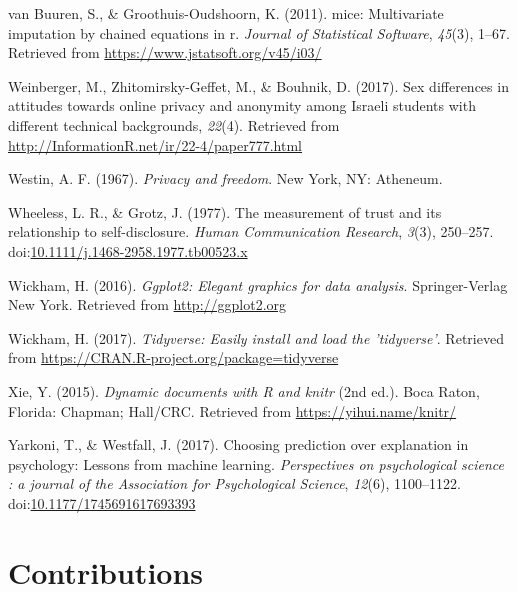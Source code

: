 \documentclass[man,floatsintext]{apa6}
\begin{document}
\leavevmode\hypertarget{ref-R-mice}{}%
van Buuren, S., \& Groothuis-Oudshoorn, K. (2011). mice: Multivariate imputation by chained equations in r. \emph{Journal of Statistical Software}, \emph{45}(3), 1--67. Retrieved from \url{https://www.jstatsoft.org/v45/i03/}

\leavevmode\hypertarget{ref-Weinberger.2017b}{}%
Weinberger, M., Zhitomirsky-Geffet, M., \& Bouhnik, D. (2017). Sex differences in attitudes towards online privacy and anonymity among Israeli students with different technical backgrounds, \emph{22}(4). Retrieved from \url{http://InformationR.net/ir/22-4/paper777.html}

\leavevmode\hypertarget{ref-Westin.1967}{}%
Westin, A. F. (1967). \emph{Privacy and freedom}. New York, NY: Atheneum.

\leavevmode\hypertarget{ref-Wheeless.1977}{}%
Wheeless, L. R., \& Grotz, J. (1977). The measurement of trust and its relationship to self-disclosure. \emph{Human Communication Research}, \emph{3}(3), 250--257. doi:\href{https://doi.org/10.1111/j.1468-2958.1977.tb00523.x}{10.1111/j.1468-2958.1977.tb00523.x}

\leavevmode\hypertarget{ref-R-ggplot2}{}%
Wickham, H. (2016). \emph{Ggplot2: Elegant graphics for data analysis}. Springer-Verlag New York. Retrieved from \url{http://ggplot2.org}

\leavevmode\hypertarget{ref-R-tidyverse}{}%
Wickham, H. (2017). \emph{Tidyverse: Easily install and load the 'tidyverse'}. Retrieved from \url{https://CRAN.R-project.org/package=tidyverse}

\leavevmode\hypertarget{ref-R-knitr}{}%
Xie, Y. (2015). \emph{Dynamic documents with R and knitr} (2nd ed.). Boca Raton, Florida: Chapman; Hall/CRC. Retrieved from \url{https://yihui.name/knitr/}

\leavevmode\hypertarget{ref-Yarkoni.2017}{}%
Yarkoni, T., \& Westfall, J. (2017). Choosing prediction over explanation in psychology: Lessons from machine learning. \emph{Perspectives on psychological science : a journal of the Association for Psychological Science}, \emph{12}(6), 1100--1122. doi:\href{https://doi.org/10.1177/1745691617693393}{10.1177/1745691617693393}

\endgroup

\newpage

\hypertarget{contributions}{%
\section{Contributions}\label{contributions}}
\end{document}
